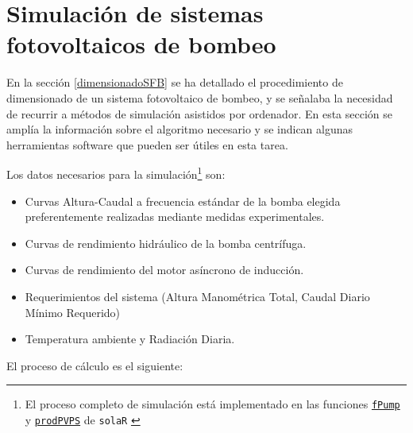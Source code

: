 \section{Simulación de sistemas fotovoltaicos de bombeo}
\label{simulacionSFB}

En la sección \ref{dimensionadoSFB} se ha detallado el procedimiento
de dimensionado de un sistema fotovoltaico de bombeo, y se señalaba la
necesidad de recurrir a métodos de simulación asistidos por
ordenador. En esta sección se amplía la información sobre el algoritmo
necesario y se indican algunas herramientas software que pueden ser
útiles en esta tarea.

Los datos necesarios para la simulación\footnote{El proceso completo
  de simulación está implementado en las funciones
  \href{http://search.r-project.org/R/library/solaR/html/fPump.html}{\texttt{fPump}}
  y
  \href{http://search.r-project.org/R/library/solaR/html/prodPVPS.html}{\texttt{prodPVPS}}
  de \texttt{solaR} \cite{Perpinan2012b}} son:
\begin{itemize}
\item Curvas Altura-Caudal a frecuencia estándar de la bomba elegida preferentemente
realizadas mediante medidas experimentales. 
\item Curvas de rendimiento hidráulico de la bomba centrífuga. 
\item Curvas de rendimiento del motor asíncrono de inducción.
\item Requerimientos del sistema (Altura Manométrica Total, Caudal Diario
Mínimo Requerido)
\item Temperatura ambiente y Radiación Diaria. 
\end{itemize}
El proceso de cálculo es el siguiente:
